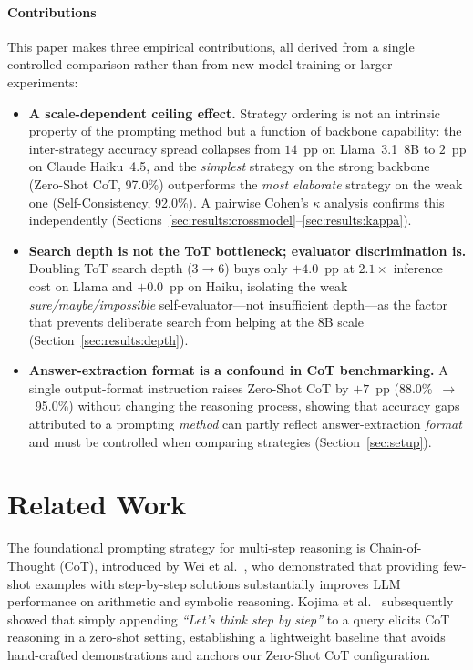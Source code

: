\documentclass[conference]{IEEEtran}
\begin{document}
\paragraph{Contributions}
This paper makes three empirical contributions, all derived from a
single controlled comparison rather than from new model training or
larger experiments:
\begin{itemize}
\item \textbf{A scale-dependent ceiling effect.} Strategy ordering is
not an intrinsic property of the prompting method but a function of
backbone capability: the inter-strategy accuracy spread collapses from
$14$~pp on Llama~3.1~8B to $2$~pp on Claude Haiku~4.5, and the
\emph{simplest} strategy on the strong backbone (Zero-Shot CoT, 97.0\%)
outperforms the \emph{most elaborate} strategy on the weak one
(Self-Consistency, 92.0\%). A pairwise Cohen's $\kappa$ analysis
confirms this independently
(Sections~\ref{sec:results:crossmodel}--\ref{sec:results:kappa}).
\item \textbf{Search depth is not the ToT bottleneck; evaluator
discrimination is.} Doubling ToT search depth (3$\rightarrow$6) buys
only $+4.0$~pp at $2.1\times$ inference cost on Llama and
$+0.0$~pp on Haiku, isolating the weak \emph{sure/maybe/impossible}
self-evaluator---not insufficient depth---as the factor that prevents
deliberate search from helping at the 8B scale
(Section~\ref{sec:results:depth}).
\item \textbf{Answer-extraction format is a confound in CoT
benchmarking.} A single output-format instruction raises Zero-Shot CoT
by $+7$~pp (88.0\%~$\rightarrow$~95.0\%) without changing the reasoning
process, showing that accuracy gaps attributed to a prompting
\emph{method} can partly reflect answer-extraction \emph{format} and
must be controlled when comparing strategies
(Section~\ref{sec:setup}).
\end{itemize}

\section{Related Work}
\label{sec:related}

The foundational prompting strategy for multi-step reasoning is
Chain-of-Thought (CoT), introduced by Wei et al.~\cite{wei2022cot},
who demonstrated that providing few-shot examples with step-by-step
solutions substantially improves LLM performance on arithmetic and
symbolic reasoning.
Kojima et al.~\cite{kojima2022zeroshot} subsequently showed that
simply appending \textit{``Let's think step by step''} to a query
elicits CoT reasoning in a zero-shot setting, establishing a
lightweight baseline that avoids hand-crafted demonstrations and
anchors our Zero-Shot CoT configuration.
\end{document}
